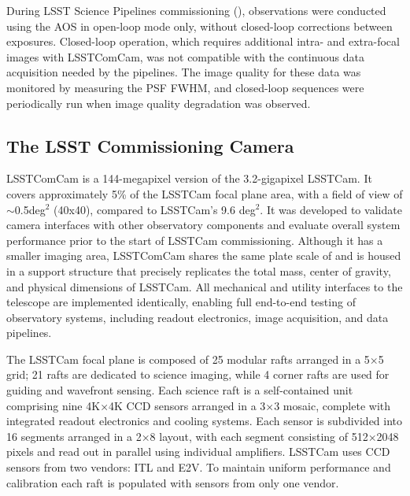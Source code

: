 During LSST \gls{Science Pipelines} commissioning (),  observations were conducted using the AOS in open-loop mode only, without closed-loop corrections between exposures. 
Closed-loop operation, which requires additional intra- and extra-focal images with LSSTComCam, was not compatible with the continuous data acquisition needed by the pipelines.
The image quality for these data was monitored by measuring the \gls{PSF} \gls{FWHM}, and closed-loop sequences were periodically run when image quality degradation was observed.

\subsection{The LSST Commissioning Camera
\label{ssec:comcam}}
\gls{LSSTComCam} \citep{2022SPIE12184E..0JS,2020SPIE11447E..0LS,2018SPIE10700E..3DH, 10.71929/rubin/2561361} is a 144-megapixel version of the 3.2-gigapixel \gls{LSSTCam}.
It covers approximately 5\% of the \gls{LSSTCam} focal plane area, with a field of view of $\sim$0.5deg$^2$   (40\arcmin x40\arcmin), compared to LSSTCam's 9.6 deg$^2$. 
It was developed to validate camera interfaces with other observatory components and evaluate overall system performance prior to the start of \gls{LSSTCam} commissioning. 
Although it has a smaller imaging area, \gls{LSSTComCam} shares the same plate scale of \rawplatescale and is housed in a support structure that precisely replicates the total mass, center of gravity, and physical dimensions of \gls{LSSTCam}. 
All mechanical and utility interfaces to the telescope are implemented identically, enabling full end-to-end testing of observatory systems, including readout electronics, image acquisition, and data pipelines.

The \gls{LSSTCam} focal plane is composed  of 25 modular rafts arranged in a 5×5 grid; 21 rafts are dedicated to science imaging, while 4 corner rafts are used for guiding and wavefront sensing.
Each science raft is a self-contained unit comprising nine 4K×4K \gls{CCD} \citep{RevModPhys.82.2307} sensors arranged in a 3×3 mosaic, complete with integrated readout electronics and cooling systems.
Each sensor is subdivided into 16 segments arranged in a 2×8 layout, with each segment consisting of 512×2048 pixels and read out in parallel using individual amplifiers.
\gls{LSSTCam} uses CCD sensors from two vendors: \gls{ITL} and \gls{E2V}.
To maintain uniform performance and \gls{calibration} each raft is populated with sensors from only one vendor.


